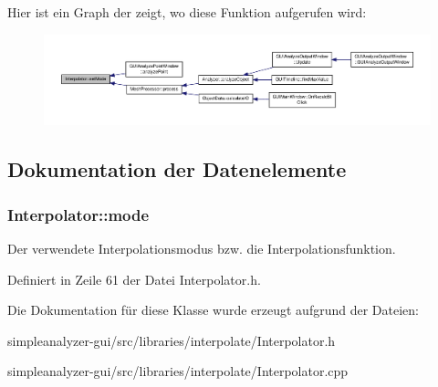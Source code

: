 Hier ist ein Graph der zeigt, wo diese Funktion aufgerufen wird\-:\nopagebreak
\begin{figure}[H]
\begin{center}
\leavevmode
\includegraphics[width=350pt]{classInterpolator_a2f9927fc580de7d2f94d85e6ca3ee3e3_icgraph}
\end{center}
\end{figure}




\subsection{Dokumentation der Datenelemente}
\hypertarget{classInterpolator_ace34e7696bdf4a1f0544b145efee898e}{
\subsubsection[{mode}]{ Interpolator\-::mode\hspace{0.3cm}{\ttfamily [private]}}}\label{classInterpolator_ace34e7696bdf4a1f0544b145efee898e}
Der verwendete Interpolationsmodus bzw. die Interpolationsfunktion. 

Definiert in Zeile 61 der Datei Interpolator.\-h.



Die Dokumentation für diese Klasse wurde erzeugt aufgrund der Dateien\-:\begin{DoxyCompactItemize}
\item 
simpleanalyzer-\/gui/src/libraries/interpolate/Interpolator.\-h\item 
simpleanalyzer-\/gui/src/libraries/interpolate/Interpolator.\-cpp\end{DoxyCompactItemize}
